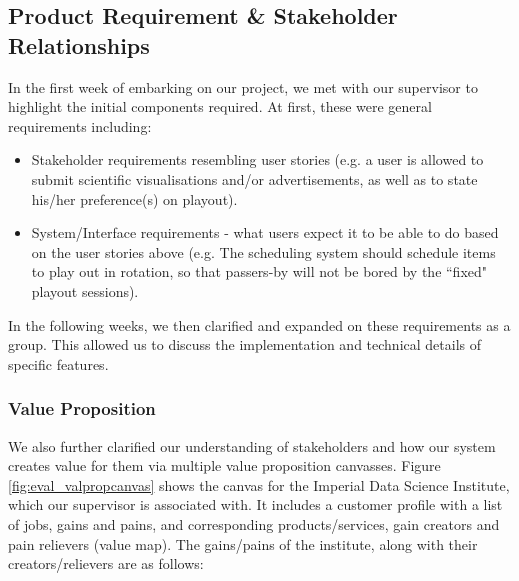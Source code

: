 \documentclass[a4paper, titlepage]{article}
\begin{document}
\subsection{Product Requirement \& Stakeholder Relationships}

In the first week of embarking on our project, we met with our supervisor to highlight the initial components required. At first, these were general
requirements including:

\begin{itemize}

  \item Stakeholder requirements resembling user stories (e.g. a user is allowed to submit scientific visualisations and/or advertisements, as well as to state his/her preference(s) on playout).

  \item System/Interface requirements - what users expect it to be able to do based on the user stories above (e.g. The scheduling system should schedule items to play out in rotation, so that passers-by will not be bored by the ``fixed" playout sessions).
\end{itemize}

In the following weeks, we then clarified and expanded on these requirements as a group. This allowed us to discuss the implementation and technical details of specific features.

\subsubsection{Value Proposition}

We also further clarified our understanding of stakeholders and how our system creates value for them via multiple value proposition canvasses. Figure \ref{fig:eval_valpropcanvas} shows the canvas for the Imperial Data Science Institute, which our supervisor is associated with. It includes a customer profile with a list of jobs, gains and pains, and corresponding products/services, gain creators and pain relievers (value map). The gains/pains of the institute, along with their creators/relievers are as follows:
\end{document}
